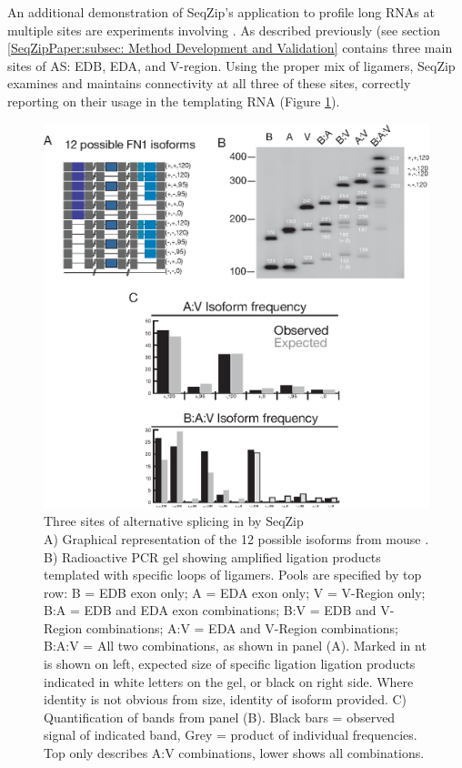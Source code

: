     An additional demonstration of SeqZip's application to profile long RNAs at multiple sites are experiments involving \fn{}. As described previously (see section \ref{SeqZipPaper:subsec: Method Development and Validation} \fn{} contains three main sites of AS: EDB, EDA, and V-region. Using the proper mix of ligamers, SeqZip examines and maintains connectivity at all three of these sites, correctly reporting on their usage in the templating RNA (Figure \ref{SeqZipMethod:fig:Three Site FN1 by SeqZip}).

    \begin{figure} %
            \centering 
            \includegraphics{Figures/SeqZipMethod/fn1ThreeSite.eps}
            \caption[Three sites of alternative splicing in \fn{} by SeqZip]
            {
              Three sites of alternative splicing in \fn{} by SeqZip\\[0.25cm]
              A) Graphical representation of the 12 possible isoforms from mouse \fn{}. B) Radioactive PCR gel showing amplified ligation products templated with specific loops of ligamers. Pools are specified by top row: B = EDB exon only; A = EDA exon only; V = V-Region only; B:A = EDB and EDA exon combinations; B:V = EDB and V-Region combinations; A:V = EDA and V-Region combinations; B:A:V = All two combinations, as shown in panel (A). Marked in nt is shown on left, expected size of specific ligation ligation products indicated in white letters on the gel, or black on right side. Where identity is not obvious from size, identity of isoform provided. C) Quantification of bands from panel (B). Black bars = observed signal of indicated band, Grey = product of individual frequencies. Top only describes A:V combinations, lower shows all combinations.
              }
            \label{SeqZipMethod:fig:Three Site FN1 by SeqZip}
            \end{figure}

